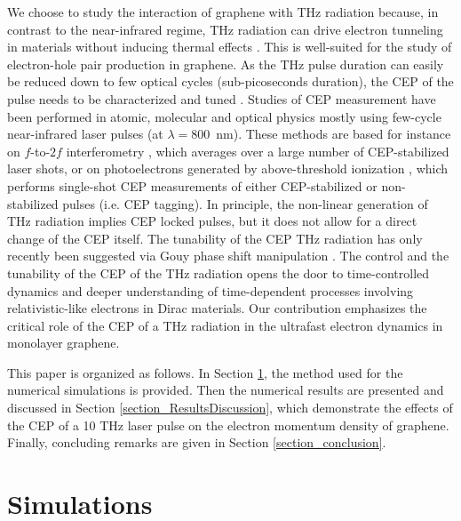\documentclass[9pt,twocolumn,twoside]{osajnl}
\begin{document}
We choose to study the interaction of graphene with THz radiation because, in contrast to the near-infrared regime, THz radiation can drive electron tunneling in materials without inducing thermal effects \cite{Yoshioka:2016jk}. This is well-suited for the study of electron-hole pair production in graphene. As the THz pulse duration can easily be reduced down to few optical cycles (sub-picoseconds duration), the CEP of the pulse needs to be characterized and tuned  \cite{Blanchard:07,Yoshioka:2016jk}. 
Studies of CEP measurement have been performed in atomic, molecular and optical physics  mostly using few-cycle near-infrared laser pulses (at $\lambda=800$~nm). These methods are based for instance on $f$-to-$2f$ interferometry \cite{Jones_Science288_635}, which averages over a large number of CEP-stabilized laser shots, or on photoelectrons generated by above-threshold ionization  \cite{Wittmann:2009fk}, which performs single-shot CEP measurements of either CEP-stabilized or non-stabilized pulses (i.e. CEP tagging).
In principle, the non-linear generation of THz radiation implies CEP locked pulses, but it does not allow for a direct change of the CEP itself. The tunability of the CEP THz radiation has only recently been suggested via Gouy phase shift manipulation \cite{Yoshioka:2016jk}. %
The control and the tunability of the CEP of the THz radiation opens the door to time-controlled dynamics and deeper understanding of time-dependent processes involving  relativistic-like electrons in Dirac materials. Our contribution emphasizes the critical role of the CEP of a THz radiation in the ultrafast electron dynamics in monolayer graphene.


This paper is organized as follows. In Section \ref{section_simulation}, the method used for the numerical simulations is provided. Then the numerical results are presented and discussed in Section \ref{section_ResultsDiscussion}, which demonstrate the effects of the CEP of a 10 THz laser pulse on the electron momentum density of graphene. Finally, concluding remarks are given in Section \ref{section_conclusion}.




\section{Simulations}\label{section_simulation}
\end{document}
